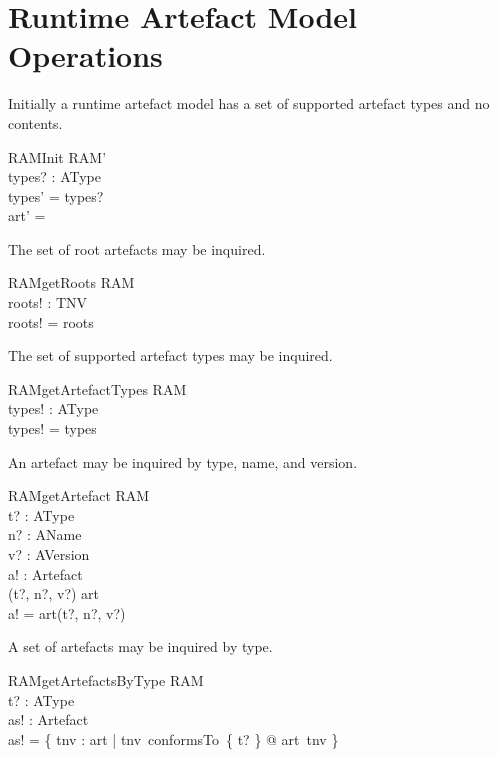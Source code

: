 \documentclass[a4paper,12pt]{article}
\begin{document}
\clearpage
\section{Runtime Artefact Model Operations}

Initially a runtime artefact model has a set of supported artefact types and no contents.
\begin{schema}{RAMInit}
RAM' \\
types? : \power AType \\
\where
types' = types? \\
art' = \empty \\
\end{schema}

The set of root artefacts may be inquired.
\begin{schema}{RAMgetRoots}
\Xi RAM \\
roots! : \power TNV \\
\where
roots! = roots \\
\end{schema}

The set of supported artefact types may be inquired.
\begin{schema}{RAMgetArtefactTypes}
\Xi RAM \\
types! : \power AType \\
\where
types! = types \\
\end{schema}

An artefact may be inquired by type, name, and version.
\begin{schema}{RAMgetArtefact}
\Xi RAM \\
t? : AType \\
n? : AName \\
v? : AVersion \\
a! : Artefact \\
\where
(t?, n?, v?) \in \dom art \\
a! = art(t?, n?, v?) \\
\end{schema}

A set of artefacts may be inquired by type.
\begin{schema}{RAMgetArtefactsByType}
\Xi RAM \\
t? : AType \\
as! : \power Artefact \\
\where
as! = \{ tnv : \dom art | tnv~conformsTo~\{ t? \} @ art~tnv \} \\
\end{schema}
\end{document}
